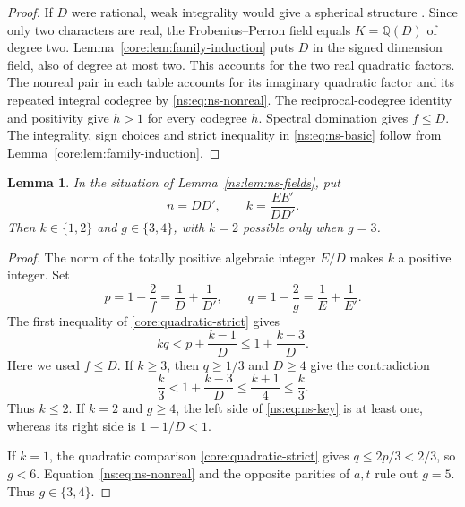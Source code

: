 \documentclass[11pt,a4paper]{article}
\newtheorem{lemma}[theorem]{Lemma}
\theoremstyle{definition}\newtheorem{definition}[theorem]{Definition}
\theoremstyle{remark}\newtheorem{remark}[theorem]{Remark}
\newcommand{\Q}{\mathbb Q}
\numberwithin{equation}{section}
\begin{document}
\begin{proof}
If $D$ were rational, weak integrality would give a spherical
structure \cite[Proposition~8.24]{ENO}. Since only two characters
are real, the Frobenius--Perron field equals $K=\Q(D)$ of degree
two. Lemma~\ref{core:lem:family-induction} puts $D$ in the signed
dimension field, also of degree at most two. This accounts for the
two real quadratic factors. The nonreal pair in each table accounts
for its imaginary quadratic factor and its repeated integral
codegree by \eqref{ns:eq:ns-nonreal}. The reciprocal-codegree
identity and positivity give $h>1$ for every codegree $h$.
Spectral domination gives $f\le D$. The integrality, sign choices
and strict inequality in \eqref{ns:eq:ns-basic} follow from
Lemma~\ref{core:lem:family-induction}.
\end{proof}

\begin{lemma}\label{ns:lem:ns-small-codegree}
In the situation of Lemma~\ref{ns:lem:ns-fields}, put
\[
 n=DD',\qquad k=\frac{EE'}{DD'}.
\]
Then $k\in\{1,2\}$ and $g\in\{3,4\}$, with $k=2$ possible only
when $g=3$.
\end{lemma}

\begin{proof}
The norm of the totally positive algebraic integer $E/D$ makes $k$
a positive integer. Set
\[
 p=1-\frac2f=\frac1D+\frac1{D'},\qquad
 q=1-\frac2g=\frac1E+\frac1{E'}.
\]
The first inequality of \eqref{core:quadratic-strict} gives
\begin{equation}\label{ns:eq:ns-key}
 kq<p+\frac{k-1}{D}\leq1+\frac{k-3}{D}.
\end{equation}
Here we used $f\leq D$. If $k\geq3$, then $q\geq1/3$ and $D\geq4$
give the contradiction
\[
 \frac{k}{3}<1+\frac{k-3}{D}\leq\frac{k+1}{4}\leq\frac{k}{3}.
\]
Thus $k\leq2$. If $k=2$ and $g\geq4$, the left side of
\eqref{ns:eq:ns-key} is at least one, whereas its right side is
$1-1/D<1$.

If $k=1$, the quadratic comparison \eqref{core:quadratic-strict}
gives $q\le2p/3<2/3$, so $g<6$.
Equation~\eqref{ns:eq:ns-nonreal} and the opposite parities of $a,t$
rule out $g=5$. Thus $g\in\{3,4\}$.
\end{proof}
\end{document}
